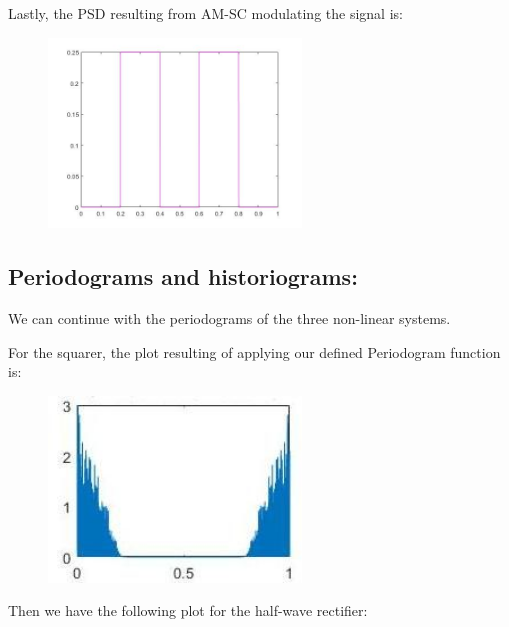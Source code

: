 \documentclass[a4paper,11pt]{article}
\begin{document}
Lastly, the PSD resulting from AM-SC modulating the signal is:

\begin{figure}[!hp]
    \begin{center}
    \includegraphics[width=0.6\textwidth]{images/lab3_figure9_4.jpg}
    \end{center}
\end{figure}

\newpage

\subsection{Periodograms and historiograms:}

We can continue with the periodograms of the three non-linear systems.

For the squarer, the plot resulting of applying our defined Periodogram function is:

\begin{figure}[!hp]
    \begin{center}
    \includegraphics[width=0.6\textwidth]{images/lab3_figure10.jpg}
    \end{center}
\end{figure}

Then we have the following plot for the half-wave rectifier:
\end{document}
